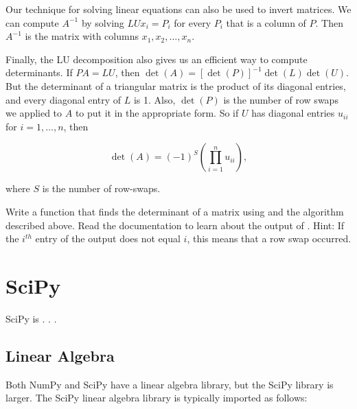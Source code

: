 Our technique for solving linear equations can also be used to invert matrices.
We can compute $A^{-1}$ by solving $LUx_i = P_i$ for every $P_i$ that is a column of $P$.
Then $A^{-1}$ is the matrix with columns $x_1, x_2, \ldots, x_n$.

Finally, the LU decomposition also gives us an efficient way to compute determinants.
If $PA=LU$, then $\det(A) = [\det(P)]^{-1}\det(L)\det(U)$.
But the determinant of a triangular matrix is the product of its diagonal entries, and every diagonal entry of $L$ is 1.
Also, $\det(P)$ is the number of row swaps we applied to $A$ to put it in the appropriate form.
So if $U$ has diagonal entries $u_{ii}$ for $i=1, \ldots, n$, then

\[
\det(A) = (-1)^S\left(\displaystyle\prod_{i=1}^nu_{ii}\right),
\]

where $S$ is the number of row-swaps.

%

\begin{problem}
\label{prob:det}
Write a function that finds the determinant of a matrix using  and the algorithm described above.
Read the documentation to learn about the output of .
Hint: If the $i^{th}$ entry of the output  does not equal $i$, this means that a row swap occurred.
\end{problem}

\section*{SciPy} %

SciPy is . . .

\subsection*{Linear Algebra} %

Both NumPy and SciPy have a linear algebra library, but the SciPy library is larger.
The SciPy linear algebra library is typically imported as follows:

